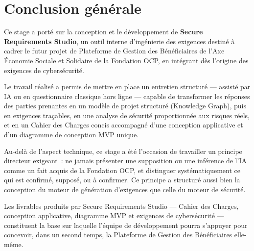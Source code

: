 \chapter{Conclusion générale}

Ce stage a porté sur la conception et le développement de \textbf{Secure Requirements
Studio}, un outil interne d'ingénierie des exigences destiné à cadrer le futur projet de
Plateforme de Gestion des Bénéficiaires de l'Axe Économie Sociale et Solidaire de la
Fondation OCP, en intégrant dès l'origine des exigences de cybersécurité.

Le travail réalisé a permis de mettre en place un entretien structuré — assisté par IA
ou en questionnaire classique hors ligne — capable de transformer les réponses des
parties prenantes en un modèle de projet structuré (Knowledge Graph), puis en exigences
traçables, en une analyse de sécurité proportionnée aux risques réels, et en un Cahier
des Charges concis accompagné d'une conception applicative et d'un diagramme de
conception MVP unique.

Au-delà de l'aspect technique, ce stage a été l'occasion de travailler un principe
directeur exigeant~: ne jamais présenter une supposition ou une inférence de l'IA comme
un fait acquis de la Fondation OCP, et distinguer systématiquement ce qui est confirmé,
supposé, ou à confirmer. Ce principe a structuré aussi bien la conception du moteur de
génération d'exigences que celle du moteur de sécurité.


Les livrables produits par Secure Requirements Studio — Cahier des Charges, conception
applicative, diagramme MVP et exigences de cybersécurité — constituent la base sur
laquelle l'équipe de développement pourra s'appuyer pour concevoir, dans un second
temps, la Plateforme de Gestion des Bénéficiaires elle-même.
